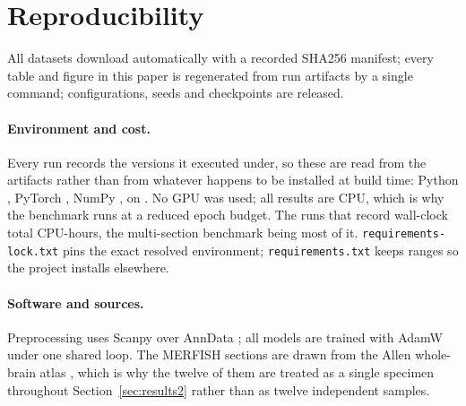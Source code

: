 \section{Reproducibility}
 All datasets download automatically with a recorded
SHA256 manifest; every table and figure in this paper is regenerated from run
artifacts by a single command; configurations, seeds and checkpoints are released.

\paragraph{Environment and cost.} Every run records the versions it executed
under, so these are read from the artifacts rather than from whatever happens to
be installed at build time: Python \EnvPython{}, PyTorch \EnvTorch{}, NumPy
\EnvNumpy{}, on \EnvMachine{}. No GPU was used; all results are CPU, which is
why the benchmark runs at a reduced epoch budget. The \ComputeRuns{} runs that
record wall-clock total \ComputeHours{} CPU-hours, the multi-section benchmark
being most of it. \texttt{requirements-lock.txt} pins the exact resolved
environment; \texttt{requirements.txt} keeps ranges so the project installs
elsewhere.

\paragraph{Software and sources.} Preprocessing uses Scanpy
\citep{wolf2018scanpy} over AnnData \citep{virshup2024anndata}; all models are
trained with AdamW \citep{loshchilov2019adamw} under one shared loop. The
MERFISH sections are drawn from the Allen whole-brain atlas
\citep{yao2023wholebrain}, which is why the twelve of them are treated as a
single specimen throughout Section~\ref{sec:results2} rather than as twelve
independent samples.
